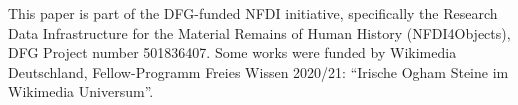 \documentclass{eceasst}
\begin{document}
\begin{acknowledge}
This paper is part of the DFG-funded NFDI initiative, specifically the Research Data Infrastructure for the Material Remains of Human History (NFDI4Objects), DFG Project number 501836407. Some works were funded by Wikimedia Deutschland, Fellow-Programm Freies Wissen 2020/21: “Irische Ogham Steine im Wikimedia Universum”.
\end{acknowledge}

\nocite{*}


\end{document}
